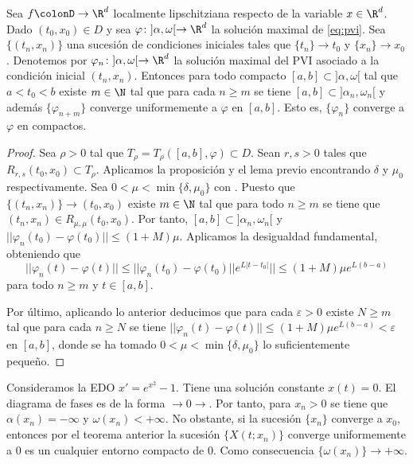 \begin{theorem}
  \label{thm:cuc-ci}
  Sea $f\colonD \to \R^d$ localmente lipschitziana respecto de la variable $x \in \R^d$. Dado
  $(t_0, x_0) \in D$ y sea $\varphi \colon ]\alpha, \omega[ \to \R^d$ la solución maximal de
  \eqref{eq:pvi}. Sea $\{(t_n, x_n)\}$ una sucesión de condiciones iniciales tales que
  $\{t_n\} \to t_0$ y $\{x_n\} \to x_0$. Denotemos por $\varphi_n\colon ]\alpha, \omega[ \to \R^d$
  la solución maximal del PVI asociado a la condición inicial $(t_n, x_n)$. Entonces para todo
  compacto $[a,b]\subset ]\alpha, \omega[$ tal que $a < t_0 < b$ existe $m \in \N$ tal que para cada
  $n \ge m$ se tiene $[a,b] \subset ]\alpha_n,\omega_n[$ y además $\{\varphi_{n+m}\}$ converge
  uniformemente a $\varphi$ en $[a,b]$. Esto es, $\{\varphi_n\}$ converge a $\varphi$ en compactos.
\end{theorem}
\begin{proof}
  Sea $\rho > 0$ tal que $T_{\rho} = T_{\rho}([a,b], \varphi) \subset D$. Sean $r, s > 0$ tales que
  $R_{r,s}(t_0, x_0) \subset T_{\rho}$. Aplicamos la proposición y el lema previo encontrando
  $\delta$ y $\mu_0$ respectivamente. Sea $0 < \mu < \min\{\delta, \mu_0\}$ con . Puesto que
  $\{(t_n, x_n)\} \to (t_0, x_0)$ existe $m \in \N$ tal que para todo $n \ge m$ se tiene que
  $(t_n, x_n) \in R_{\mu,\mu}(t_0, x_0)$. Por tanto, $[a,b] \subset ]\alpha_n,\omega_n[$ y
  $||\varphi_n(t_0) - \varphi(t_0)|| \le (1+M)\mu$. Aplicamos la desigualdad fundamental, obteniendo
  que
  \[||\varphi_n(t) - \varphi(t)|| \le ||\varphi_n(t_0) - \varphi(t_0)|| e^{L|t-t_0|} || \le (1+M)\mu
    e^{L(b-a)} \] para todo $n \ge m$ y $t \in [a,b]$.
  
  Por último, aplicando lo anterior deducimos que para cada $\varepsilon > 0$ existe $N \ge m$ tal
  que para cada $n \ge N$ se tiene
  $||\varphi_n(t) - \varphi(t)|| \le (1+M)\mu e^{L(b-a)} < \varepsilon$ en $[a,b]$, donde se ha
  tomado $0 < \mu < \min\{\delta, \mu_0\}$ lo suficientemente pequeño.
\end{proof}

\begin{ex}
  Consideramos la EDO $x' = e^{x^2} -1$. Tiene una solución constante $x(t) = 0$. El diagrama de
  fases es de la forma $\rightarrow 0 \rightarrow$. Por tanto, para $x_n > 0$ se tiene que
  $\alpha(x_n) = -\infty$ y $\omega(x_n) < +\infty$. No obstante, si la sucesión $\{x_n\}$ converge
  a $x_0$, entonces por el teorema anterior la sucesión $\{X(t;x_n)\}$ converge uniformemente a $0$
  es un cualquier entorno compacto de $0$. Como consecuencia $\{\omega(x_n)\} \to +\infty$.
\end{ex}

